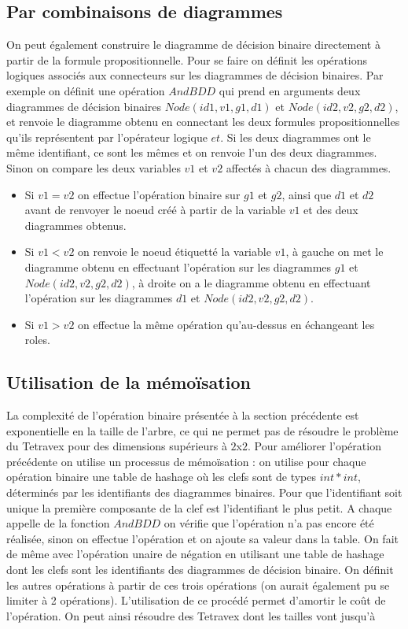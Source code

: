 \documentclass[11pt]{article}
\begin{document}
\subsection{Par combinaisons de diagrammes}
On peut également construire le diagramme de décision binaire directement à partir de la formule propositionnelle. Pour se faire on définit les opérations logiques associés aux connecteurs sur les diagrammes de décision binaires. Par exemple on définit une opération $AndBDD$ qui prend en arguments deux diagrammes de décision binaires $Node(id1, v1, g1, d1)$ et $Node(id2, v2, g2, d2)$, et renvoie le diagramme obtenu en connectant les deux formules propositionnelles qu'ils représentent par l'opérateur logique $et$. Si les deux diagrammes ont le même identifiant, ce sont les mêmes et on renvoie l'un des deux diagrammes. Sinon on compare les deux variables $v1$ et $v2$ affectés à chacun des diagrammes.
\begin{itemize}
\item Si $v1 = v2$ on effectue l'opération binaire sur $g1$ et $g2$, ainsi que $d1$ et $d2$ avant de renvoyer le noeud créé à partir de la variable $v1$ et des deux diagrammes obtenus.
\item Si $v1 < v2$ on renvoie le noeud étiquetté la variable $v1$, à gauche on met le diagramme obtenu en effectuant l'opération sur les diagrammes $g1$ et $Node(id2, v2, g2, d2)$, à droite on a le diagramme obtenu en effectuant l'opération sur les diagrammes $d1$ et $Node(id2, v2, g2, d2)$.
\item Si $v1 > v2$ on effectue la même opération qu'au-dessus en échangeant les roles.
\end{itemize}
  
\subsection{Utilisation de la mémoïsation}
La complexité de l'opération binaire présentée à la section précédente est exponentielle en la taille de l'arbre, ce qui ne permet pas de résoudre le problème du Tetravex pour des dimensions supérieurs à $2$x$2$. Pour améliorer l'opération précédente on utilise un processus de mémoïsation : on utilise pour chaque opération binaire une table de hashage où les clefs sont de types $int * int$, déterminés par les identifiants des diagrammes binaires. Pour que l'identifiant soit unique la première composante de la clef est l'identifiant le plus petit. A chaque appelle de la fonction $AndBDD$ on vérifie que l'opération n'a pas encore été réalisée, sinon on effectue l'opération et on ajoute sa valeur dans la table. On fait de même avec l'opération unaire de négation en utilisant une table de hashage dont les clefs sont les identifiants des diagrammes de décision binaire. On définit les autres opérations à partir de ces trois opérations (on aurait également pu se limiter à 2 opérations). L'utilisation de ce procédé permet d'amortir le coût de l'opération. On peut ainsi résoudre des Tetravex dont les tailles vont jusqu'à
\end{document}

